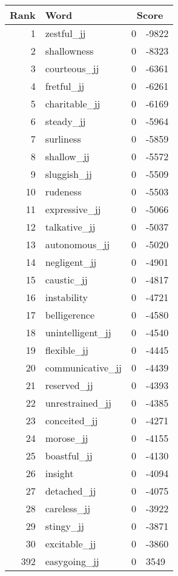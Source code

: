 \begin{longtable}[!htbp]{| rlr@{.}l |}
    \hline
    \textbf{Rank} & \textbf{Word} & \multicolumn{2}{c|}{\textbf{Score}} \\
    \hline
    \endhead
    1 & zestful\_jj & 0 & -9822 \\
    2 & shallowness & 0 & -8323 \\
    3 & courteous\_jj & 0 & -6361 \\
    4 & fretful\_jj & 0 & -6261 \\
    5 & charitable\_jj & 0 & -6169 \\
    6 & steady\_jj & 0 & -5964 \\
    7 & surliness & 0 & -5859 \\
    8 & shallow\_jj & 0 & -5572 \\
    9 & sluggish\_jj & 0 & -5509 \\
    10 & rudeness & 0 & -5503 \\
    11 & expressive\_jj & 0 & -5066 \\
    12 & talkative\_jj & 0 & -5037 \\
    13 & autonomous\_jj & 0 & -5020 \\
    14 & negligent\_jj & 0 & -4901 \\
    15 & caustic\_jj & 0 & -4817 \\
    16 & instability & 0 & -4721 \\
    17 & belligerence & 0 & -4580 \\
    18 & unintelligent\_jj & 0 & -4540 \\
    19 & flexible\_jj & 0 & -4445 \\
    20 & communicative\_jj & 0 & -4439 \\
    21 & reserved\_jj & 0 & -4393 \\
    22 & unrestrained\_jj & 0 & -4385 \\
    23 & conceited\_jj & 0 & -4271 \\
    24 & morose\_jj & 0 & -4155 \\
    25 & boastful\_jj & 0 & -4130 \\
    26 & insight & 0 & -4094 \\
    27 & detached\_jj & 0 & -4075 \\
    28 & careless\_jj & 0 & -3922 \\
    29 & stingy\_jj & 0 & -3871 \\
    30 & excitable\_jj & 0 & -3860 \\
    392 & easygoing\_jj & 0 & 3549 \\

\end{longtable}
